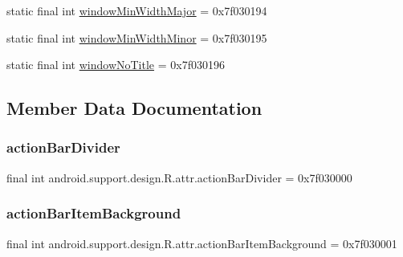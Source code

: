 \begin{DoxyCompactItemize}
\item 
static final int \mbox{\hyperlink{classandroid_1_1support_1_1design_1_1R_1_1attr_a74613b10ae2f42e095723fcea4f56a36}{window\+Min\+Width\+Major}} = 0x7f030194
\item 
static final int \mbox{\hyperlink{classandroid_1_1support_1_1design_1_1R_1_1attr_a1690dd58d6b1695579d1cbdcb36fa7b4}{window\+Min\+Width\+Minor}} = 0x7f030195
\item 
static final int \mbox{\hyperlink{classandroid_1_1support_1_1design_1_1R_1_1attr_ae7659b443bdf6ecfbb0bb28a213c6670}{window\+No\+Title}} = 0x7f030196
\end{DoxyCompactItemize}


\subsection{Member Data Documentation}
\mbox{\label{classandroid_1_1support_1_1design_1_1R_1_1attr_ae760bb3759dc75e0a49d12b13a525863}} 
\subsubsection{\texorpdfstring{action\+Bar\+Divider}{actionBarDivider}}
{\footnotesize\ttfamily final int android.\+support.\+design.\+R.\+attr.\+action\+Bar\+Divider = 0x7f030000\hspace{0.3cm}{\ttfamily [static]}}

\mbox{\label{classandroid_1_1support_1_1design_1_1R_1_1attr_a22428b19c7a60481d738d41421d2cae0}} 
\subsubsection{\texorpdfstring{action\+Bar\+Item\+Background}{actionBarItemBackground}}
{\footnotesize\ttfamily final int android.\+support.\+design.\+R.\+attr.\+action\+Bar\+Item\+Background = 0x7f030001\hspace{0.3cm}{\ttfamily [static]}}

